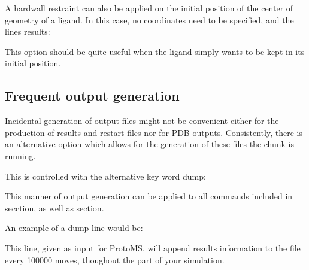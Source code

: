 \documentclass[letterpaper,10pt,english]{sphinxmanual}
\begin{document}
A hardwall restraint can also be applied on the initial position of the center of geometry of a ligand. In this case, no coordinates need to be specified, and the lines results:

%
\begin{sphinxVerbatim}[commandchars=\\\{\}]
    
\end{sphinxVerbatim}

This option should be quite useful when the ligand simply wants to be kept in its initial position.


\subsection{Frequent output generation}
\label{\detokenize{protoms:frequent-output-generation}}
Incidental generation of output files might not be convenient either for the production of results and restart files nor for PDB outputs. Consistently, there is an alternative option which allows for the generation of these files  the  chunk is running.

\ignorespaces 
This is controlled with the alternative key word dump:

%
\begin{sphinxVerbatim}[commandchars=\\\{\}]
  
\end{sphinxVerbatim}

This manner of output generation can be applied to all commands included in {\hyperref[\detokenize{protoms:results-and-restarts}]{}} secction, as well as {\hyperref[\detokenize{protoms:pdb-output}]{}} section.

An example of a dump line would be:

%
\begin{sphinxVerbatim}[commandchars=\\\{\}]
    
\end{sphinxVerbatim}

This line, given as input for ProtoMS, will append results information to the  file every 100000 moves, thoughout the  part of your simulation.
\end{document}
